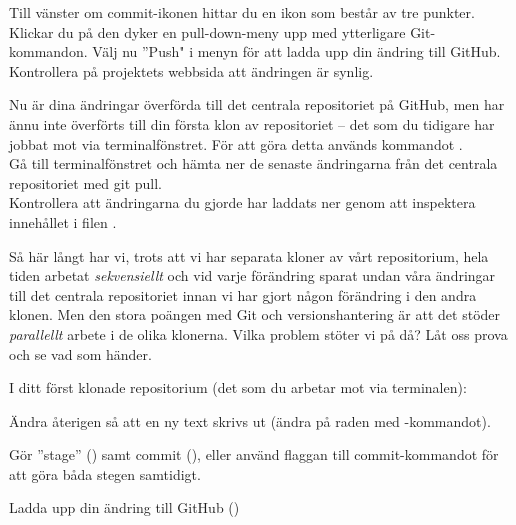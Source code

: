 \begin{Datorarbete}
	\item Till vänster om commit-ikonen hittar du en ikon som består av tre punkter. Klickar du på den dyker en pull-down-meny upp med ytterligare Git-kommandon. Välj nu ''Push" i menyn för att ladda upp din ändring till GitHub. Kontrollera på projektets webbsida att ändringen är synlig.

	\item Nu är dina ändringar överförda till det centrala repositoriet på GitHub, men har ännu inte överförts till din första klon av repositoriet -- det som du tidigare har jobbat mot via terminalfönstret. För att göra detta används kommandot .
	\\


	\code{[\ref{git-pull-term}]} Gå till terminalfönstret och hämta ner de senaste ändringarna från det centrala repositoriet med git pull.
	\\


	Kontrollera att ändringarna du gjorde har laddats ner genom att inspektera innehållet i filen .

	\item Så här långt har vi, trots att vi har separata kloner av vårt repositorium, hela tiden arbetat \emph{sekvensiellt} och vid varje förändring sparat undan våra ändringar till det centrala repositoriet innan vi har gjort någon förändring i den andra klonen. Men den stora poängen med Git och versionshantering är att det stöder \emph{parallellt} arbete i de olika klonerna. Vilka problem stöter vi på då? Låt oss prova och se vad som händer.


	\code{[\ref{git-conflict-1}]} I ditt först klonade repositorium (det som du arbetar mot via terminalen):
	\begin{Deluppgifter}
		\item Ändra återigen  så att en ny text skrivs ut (ändra på raden med -kommandot).
		\item Gör ''stage'' () samt commit (), eller använd flaggan  till commit-kommandot för att göra båda stegen samtidigt.
		\item Ladda upp din ändring till GitHub ()
	\end{Deluppgifter}


\end{Datorarbete}
